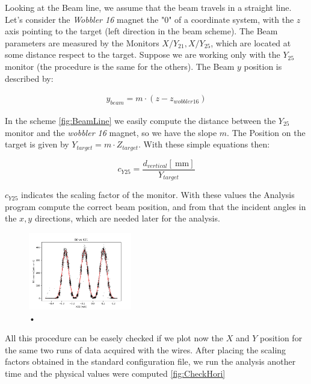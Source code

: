 Looking at the Beam line, we assume that the beam travels in a straight line. Let's consider the \textit{Wobbler 16} magnet the "$0$" of a coordinate system, with the $z$ axis pointing to the target (left direction in the beam scheme). The Beam parameters are measured by the Monitors $X/Y_{21}, X/Y_{25}$, which are located at some distance respect to the target. Suppose we are working only with the $Y_{25}$ monitor (the procedure is the same for the others). The Beam $y$ position is described by:

\begin{align*}
y_{beam} = m \cdot (z - z_{wobbler 16})
\end{align*}

In the scheme \ref{fig:BeamLine} we easily compute the distance between the $Y_{25}$ monitor and the \textit{wobbler 16} magnet, so we have the slope $m$. The Position on the target is given by $Y_{target} = m \cdot Z_{target}$. With these simple equations then:

\begin{equation}
c_{Y25} = \dfrac{d_{vertical} [\SI{}{\milli \meter}]}{ Y_{target}} 
\end{equation}

$c_{Y25}$ indicates the scaling factor of the monitor. With these values the Analysis program compute the correct beam position, and from that the incident angles in the $x,y$ directions, which are needed later for the analysis.

\begin{figure}[hbtp]
\centering
\includegraphics[width=0.4\textwidth]{Analysis/HorizontalCalibration.png}
\caption{•}
\label{fig:HorizontalCalibration}
\end{figure}

All this procedure can be easely checked if we plot now the $X$ and $Y$ position for the same two runs of data acquired with the wires. After placing the scaling factors obtained in the standard configuration file, we run the analysis another time and the physical values were computed \ref{fig:CheckHori}

